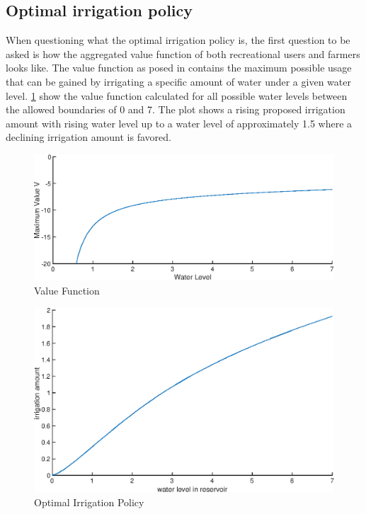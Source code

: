 \documentclass[12pt, a4paper, oneside]{article}
\begin{document}
	\subsection{Optimal irrigation policy}
	When questioning what the optimal irrigation policy is, the first question to be asked is how the aggregated value function of both recreational users and farmers looks like.
	The value function as posed in %
	contains the maximum possible usage that can be gained by irrigating a specific amount of water under a given water level. 
	\ref{fig:value-function} show the value function calculated for all possible water levels between the allowed boundaries of 0 and 7.
	The plot shows a rising proposed irrigation amount with rising water level up to a water level of approximately 1.5 where a declining irrigation amount is favored.
	\begin{figure}[ht]
		\includegraphics[width=1\textwidth]{figures/value_function.eps}
		\caption{Value Function}
		\label{fig:value-function}
	\end{figure}
	\begin{figure}[ht]
		\includegraphics[width=1\textwidth]{figures/OptimalIrrigationPolicy.eps}
		\caption{Optimal Irrigation Policy}
		\label{fig:optimal-irrigation-policy}
	\end{figure}
\end{document}
